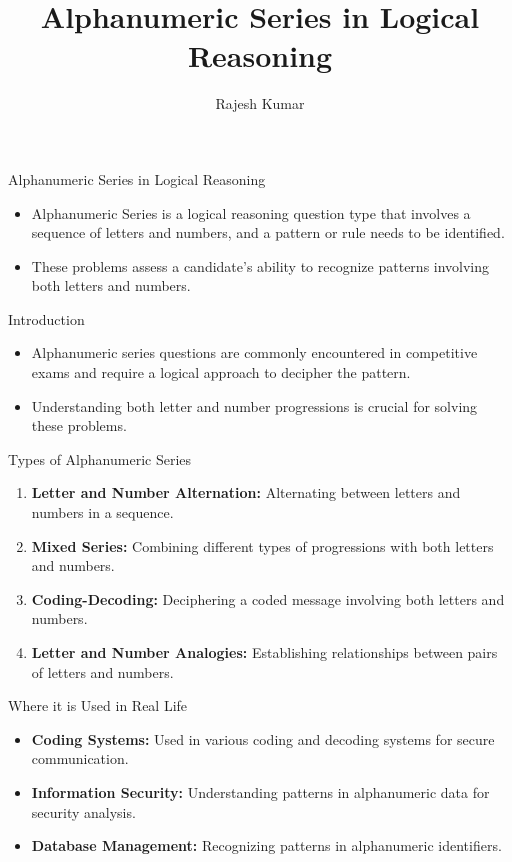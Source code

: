 \title{Alphanumeric Series in Logical Reasoning}
\author{Rajesh Kumar}
\date{}

\begin{frame}
  \titlepage
\end{frame}

\begin{frame}{Alphanumeric Series in Logical Reasoning}
  \begin{itemize}
    \item Alphanumeric Series is a logical reasoning question type that involves a sequence of letters and numbers, and a pattern or rule needs to be identified.
    \item These problems assess a candidate's ability to recognize patterns involving both letters and numbers.
  \end{itemize}
\end{frame}

\begin{frame}{Introduction}
  \begin{itemize}
    \item Alphanumeric series questions are commonly encountered in competitive exams and require a logical approach to decipher the pattern.
    \item Understanding both letter and number progressions is crucial for solving these problems.
  \end{itemize}
\end{frame}

\begin{frame}{Types of Alphanumeric Series}
  \begin{enumerate}
    \item \textbf{Letter and Number Alternation:} Alternating between letters and numbers in a sequence.
    \item \textbf{Mixed Series:} Combining different types of progressions with both letters and numbers.
    \item \textbf{Coding-Decoding:} Deciphering a coded message involving both letters and numbers.
    \item \textbf{Letter and Number Analogies:} Establishing relationships between pairs of letters and numbers.
  \end{enumerate}
\end{frame}

\begin{frame}{Where it is Used in Real Life}
  \begin{itemize}
    \item \textbf{Coding Systems:} Used in various coding and decoding systems for secure communication.
    \item \textbf{Information Security:} Understanding patterns in alphanumeric data for security analysis.
    \item \textbf{Database Management:} Recognizing patterns in alphanumeric identifiers.
  \end{itemize}
\end{frame}

